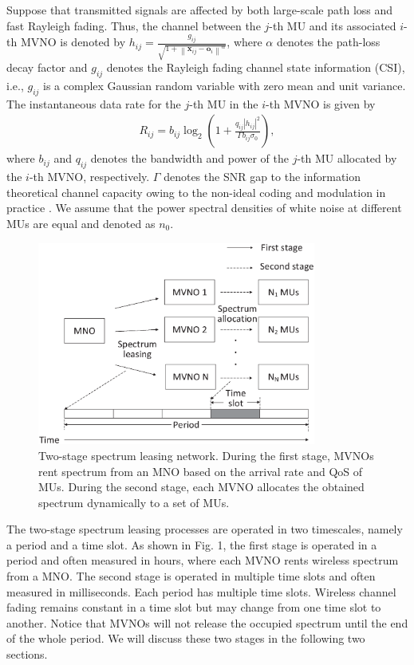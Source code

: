 \documentclass[journal]{IEEEtran}
\begin{document}
Suppose that transmitted signals are affected by both large-scale path loss and fast Rayleigh fading. Thus, the channel between the $j$-th MU and its associated $i$-th MVNO is denoted by $h_{ij} = \frac{g_{ij}}{\sqrt{1 + {\left\| \mathbf{x}_{ij} - \mathbf{o}_i \right\|}^\alpha}}$, where $\alpha$ denotes the path-loss decay factor  and $g_{ij}$ denotes the Rayleigh fading channel state information (CSI), i.e., $g_{ij}$ is a complex Gaussian random variable with zero mean and unit variance. The instantaneous data rate for the $j$-th MU in the $i$-th MVNO is given by
\begin{align}
	R_{ij} = b_{ij}\log_2\left(1 + \frac{q_{ij} \left|h_{ij} \right|^2 }{\Gamma b_{ij}\sigma_0}\right),
\end{align}
where $b_{ij}$ and $q_{ij}$ denotes the bandwidth and power of the $j$-th MU allocated by the $i$-th MVNO, respectively. $\Gamma$ denotes the SNR gap to the information theoretical channel capacity owing to the
non-ideal coding and modulation in practice \cite{JGDForney}. We assume that the power spectral densities of white noise at different MUs are equal and denoted as $n_0$.                  
\begin{figure}
	\centering
	\includegraphics[width=3.6in]{Pic.eps}
	\caption{Two-stage spectrum leasing network. During the first stage, MVNOs rent spectrum from an MNO based on the arrival rate and QoS of MUs. During the second stage, each MVNO allocates the obtained spectrum dynamically to a set of MUs.}
\end{figure}

The two-stage spectrum leasing processes are operated in two timescales, namely a period and a time slot. As shown in Fig. 1, the first stage is operated in a period and often measured in hours, where each MVNO rents wireless spectrum from a MNO. The second stage is operated in multiple time slots and often measured in milliseconds. Each period has multiple time slots. Wireless channel fading remains constant in a time slot but may change from one time slot to another. Notice that MVNOs will not release the occupied spectrum until the end of the whole period. We will discuss these two stages in the following two sections.
\end{document}
